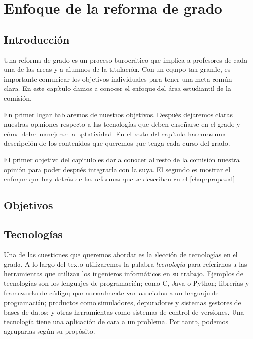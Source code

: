 \chapter{Enfoque de la reforma de grado}\label{chap:approach}

\section{Introducción}


Una reforma de grado es un proceso burocrático que implica a
profesores de cada una de las áreas y a alumnos de la titulación.
Con un equipo tan grande,
es importante comunicar los objetivos individuales para
tener una meta común clara.
En este capítulo damos a conocer el enfoque del área estudiantil de la comisión.


En primer lugar hablaremos de nuestros objetivos.
Después dejaremos claras nuestras opiniones respecto a
las tecnologías que deben enseñarse en el grado y
cómo debe manejarse la optatividad.
En el resto del capítulo
haremos una descripción de
los contenidos que queremos que tenga cada curso del grado.


El primer objetivo del capítulo es
dar a conocer al resto de la comisión nuestra opinión
para poder después integrarla con la suya.
El segundo es mostrar el enfoque que
hay detrás de las reformas que se describen en el \cref{chap:proposal}.

\section{Objetivos}

\section{Tecnologías}

Una de las cuestiones que queremos abordar es
la elección de tecnologías en el grado.
A lo largo del texto utilizaremos la palabra \emph{tecnología} para referirnos a
las herramientas que utilizan los ingenieros informáticos en su trabajo.
Ejemplos de tecnologías son
los lenguajes de programación;
como C, Java o Python;
librerías y frameworks de código;
que normalmente van asociadas a un lenguaje de programación;
productos como simuladores, depuradores y sistemas gestores de bases de datos; y
otras herramientas como sistemas de control de versiones.
Una tecnología tiene una aplicación de cara a un problema.
Por tanto, podemos agruparlas según su propósito.

